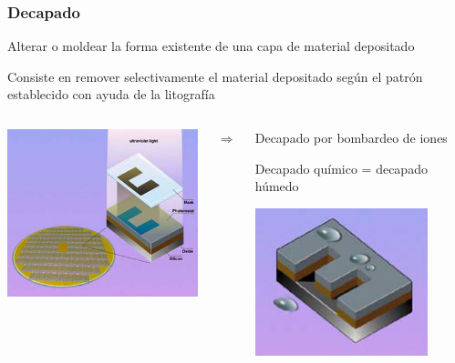 \documentclass[aspectratio=169,10pt]{beamer}
\begin{document}
\begin{frame}
\frametitle{Decapado}
\centering
Alterar o moldear la forma existente de una capa de material depositado

\vspace{4mm}Consiste en remover selectivamente el material depositado según el patrón establecido con ayuda de la litografía

\vspace{4mm}
\begin{columns}
\begin{column}{0.45\textwidth}
	\centering
	\includegraphics[width=5.75cm]{decapado1}
\end{column}
\begin{column}{0.1\textwidth}
	\centering
	$\Rightarrow$
\end{column}
\begin{column}{0.45\textwidth}
Decapado por bombardeo de iones

Decapado químico = decapado húmedo

\includegraphics[width=5cm]{decapado2}
\end{column}

\end{columns}
\end{frame}
\end{document}

